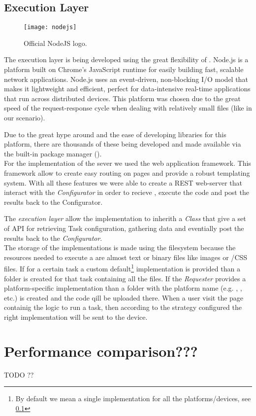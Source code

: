 \subsection{Execution Layer}
\begin{figure}[htb]
    \centering
    \texttt{[image: nodejs]}
    \caption{Official NodeJS logo.}
    \label{fig:node-logo}
\end{figure}
The execution layer is being developed using the great flexibility of .
Node.js is a platform built on Chrome's JavaScript runtime for easily building fast,
scalable network applications. Node.js uses an event-driven, non-blocking I/O model
that makes it lightweight and efficient, perfect for data-intensive real-time
applications that run across distributed devices.
This platform was chosen due to the great speed of the request-response cycle
when dealing with relatively small files (like in our scenario).

Due to the great hype around  and the ease of developing
libraries for this platform, there are thousands of these being developed and
made available via the built-in package manager ().\\

For the implementation of the sever we used the  web
application framework. This framework allow to create easy routing on pages and
provide a robust templating system. With all these features we were able to
create a REST web-server that interact with the \emph{Configurator} in order to
recieve \utask{}, execute the code and post the results back to the Configurator.

The \emph{execution layer} allow the \utask{} implementation to inherith a
\js{} \emph{Class} that give a set of API for retrieving Task configuration,
gathering data and eventially post the \utask{} results back to the
\emph{Configurator}.\\

The storage of the \utask{} implementations is made using the filesystem because
the resources needed to execute a \utask{} are almost text or binary files like
images or \js{}/\ac{CSS} files. If for a certain task a custom default\footnote{
By default we mean a single implementation for all the platforms/devices, see
\ref{} } implementation is provided than a  folder is created for
that task containing all the files. If the \emph{Requester} provides a
platform-specific implementation than a folder with the platform name (e.g.
, , etc.) is created and the code qill be uploaded
there. When a user visit the page containig the logic to run a task, then according
to the strategy configured the right implementation will be sent to the device.


\section{Performance comparison???}
\label{sec:implementation:performance}

TODO ??
